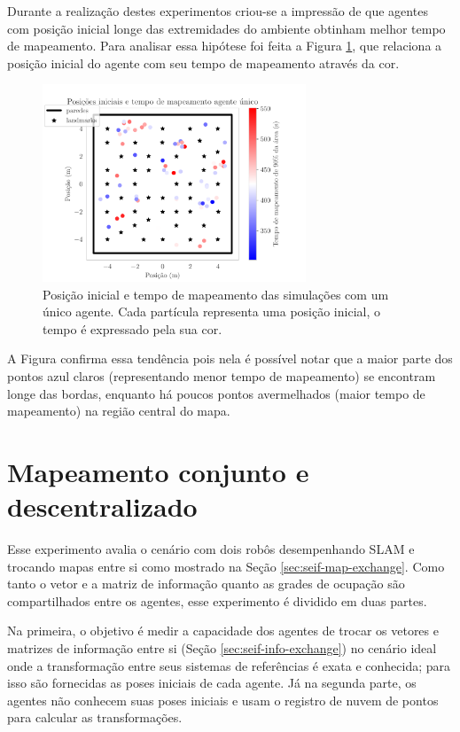 Durante a realização destes experimentos criou-se a impressão de que agentes com posição inicial longe das extremidades do ambiente obtinham 
melhor tempo de mapeamento. Para analisar essa hipótese foi feita a Figura \ref{fig:single-agent-initial-pos-and-time}, que relaciona a 
posição inicial do agente com seu tempo de mapeamento através da cor. 

\begin{figure}
  \centering
  \includegraphics[width=0.7\textwidth]{figs/single-agent/initial_positions_and_time_single_agent.pdf}
  \caption[Posição inicial e tempo de mapeamento das simulações com um único agente.]{Posição inicial e tempo de mapeamento das simulações com um único agente. Cada partícula representa uma posição inicial, o tempo é expressado pela sua cor.}
  \label{fig:single-agent-initial-pos-and-time}
\end{figure}
A Figura confirma essa tendência pois nela é possível notar que a maior parte dos pontos azul claros (representando menor tempo de mapeamento) se 
encontram longe das bordas, enquanto há poucos pontos avermelhados (maior tempo de mapeamento) na região central do mapa.

\section{Mapeamento conjunto e descentralizado}
Esse experimento avalia o cenário com dois robôs desempenhando SLAM 
e trocando mapas entre si como mostrado na Seção \ref{sec:seif-map-exchange}. Como tanto o vetor e a matriz de informação 
quanto as grades de ocupação são compartilhados entre os agentes, esse 
experimento é dividido em duas partes.

Na primeira, o objetivo é medir a 
capacidade dos agentes de trocar os vetores e matrizes de informação 
entre si (Seção \ref{sec:seif-info-exchange}) no cenário ideal onde a
transformação entre seus sistemas de referências é exata e conhecida; para isso são fornecidas as poses iniciais de cada agente. Já 
na segunda parte, os agentes não conhecem suas poses iniciais e usam o 
registro de nuvem de pontos para calcular as transformações.

